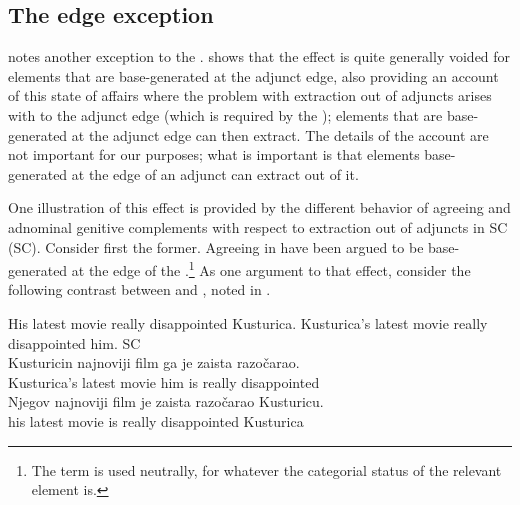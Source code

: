 \documentclass[output=paper]{langsci/langscibook}
\begin{document}
\subsection{The edge exception}\label{sub:35.3.3}

\textcite{Boskovic2018} notes another exception to the
.  \textcite{Boskovic2018} shows that
the  effect is quite generally voided
for elements that are base-generated at the adjunct edge, also providing an
account of this state of affairs where the problem with extraction out of
adjuncts arises with  to the adjunct edge (which is required by
the ); elements that are base-generated at the adjunct edge
can then extract.  The details of the account are not important for our
purposes; what is important is that elements base-generated at the edge of an
adjunct can extract out of it.

One illustration of this effect is provided by the different behavior of
agreeing  and adnominal genitive complements
with respect to extraction out of adjuncts in \glsdesc{SC}
(\gls{SC}).  Consider first the former.  Agreeing  in
 have been argued to be base-generated at the edge of the
.\footnote{The term  is used neutrally, for
whatever the categorial status of the relevant element is.} As one argument to
that effect, consider the following  contrast between
 and , noted in \textcite{Despic2011,Despic2013}.

\ea\label{ex:35.17}
	\ea His latest movie really disappointed Kusturica.
	\ex Kusturica’s latest movie really disappointed him.
    \ex\label{ex-26:17c} \glsdesc{SC} \parencites[31]{Despic2011}[245]{Despic2013}\\
        \gll    \llap{*}Kusturicin najnoviji  film ga je zaista razočarao.\\
                Kusturica’s  latest  movie  him  is  really  disappointed\\
	\ex
        \gll    \llap{*}Njegov najnoviji film je zaista razočarao Kusturicu.\\
                his latest movie is really disappointed Kusturica\\
	\z
\z
\end{document}
